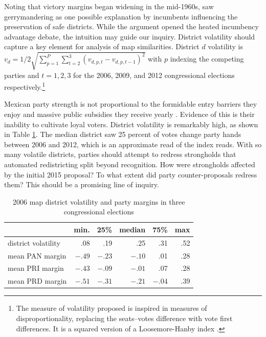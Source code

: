 \documentclass[letter,12pt]{article}
\begin{document}

Noting that victory margins began widening in the mid-1960s, \citet{mayhew1974vanishingMg} saw gerrymandering as one possible explanation by incumbents influencing the preservation of safe districts. While the argument opened the heated incumbency advantage debate, the intuition may guide our inquiry. District volatility should capture a key element for analysis of map similarities. District $d$ volatility is $v_d = 1/2 \sqrt{ \sum_{p=1}^P \sum_{t=2}^3 (v_{d,p,t}- v_{d,p,t-1})^2 }$ with $p$ indexing the competing parties and $t=1,2,3$ for the 2006,  2009, and 2012 congressional elections respectively.\footnote{The measure of volatility proposed is inspired in measures of disproportionality, replacing the seats--votes difference with vote first differences. It is a squared version of a Loosemore-Hanby index \citep{loosemore.hanbyDisproportionality1971,gallagherDisproportionality1991}.} 

Mexican party strength is not proportional to the formidable entry barriers they enjoy and massive public subsidies they receive yearly \citep{magar.2007ref.2015}. Evidence of this is their inability to cultivate loyal voters. District volatility is remarkably high, as shown in Table \ref{T:volatMarginsd0}. The median district saw 25 percent of votes change party hands between 2006 and 2012, which is an approximate read of the index reads. With so many volatile districts, parties should attempt to redress strongholds that automated redistricting split beyond recognition. How were strongholds affected by the initial 2015 proposal? To what extent did party counter-proposals redress them? This should be a promising line of inquiry. 

\begin{table}
\begin{center}
\begin{tabular}{lrrrrr}
                    &  min.   &  25\%   & median  & 75\%   & max \\ \hline
district volatility &  .08    & .19     & .25     & .31    & .52 \\
mean PAN margin     &  $-.49$ & $-.23$  & $-.10$  & .01    & .28 \\   
mean PRI margin     &  $-.43$ & $-.09$  & $-.01$  & .07    & .28 \\   
mean PRD margin     &  $-.51$ & $-.31$  & $-.21$  & $-.04$ & .39 \\
\end{tabular}
\caption{2006 map district volatility and party margins in three congressional elections}\label{T:volatMarginsd0}
\end{center}
\end{table}
\end{document}
